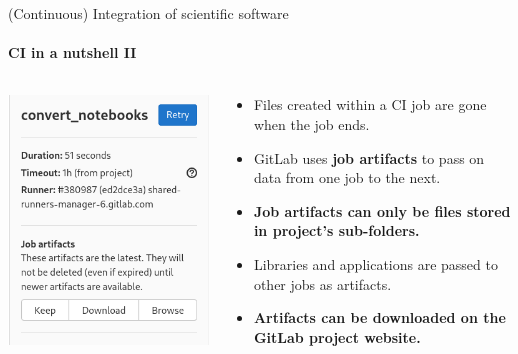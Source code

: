 \begin{frame}{(Continuous) Integration of scientific software} 
\framesubtitle{CI in a nutshell II}
    \vfill
    
    \begin{columns}
        \begin{column}[c]{0.3\textwidth}
            \includegraphics[width=\textwidth]{figures/artifacts.png}
        \end{column}
        \begin{column}[c]{0.7\textwidth}
            \begin{itemize}
                \item Files created within a CI job are gone when the job ends. 
                \item GitLab uses \textbf{job artifacts} to pass on data from one job to the next. 
                \item \textbf{Job artifacts can only be files stored in project's sub-folders.} 
                \item Libraries and applications are passed to other jobs as artifacts. 
                \item \textbf{Artifacts can be downloaded on the GitLab project website.}
            \end{itemize}
        \end{column}
    \end{columns}


\end{frame}

